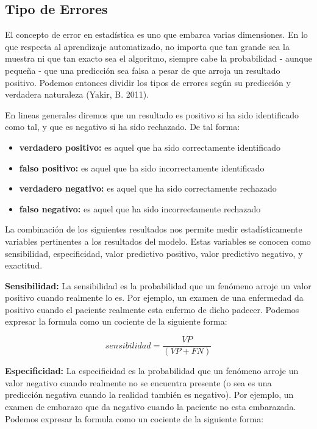 \begin{spacing}{1.5}
\subsection{Tipo de Errores}
El concepto de error en estadística es uno que embarca varias dimensiones. En lo que respecta al aprendizaje automatizado, no importa que tan grande sea la muestra ni que tan exacto sea el algoritmo, siempre cabe la probabilidad - aunque pequeña - que una predicción sea falsa a pesar de que arroja un resultado positivo. Podemos entonces dividir los tipos de errores según su predicción y verdadera naturaleza (Yakir, B. 2011). 

En lineas generales diremos que un resultado es positivo si ha sido identificado como tal, y que es negativo si ha sido rechazado. De tal forma:
\begin{itemize}
	\item \textbf{verdadero positivo:} es aquel que ha sido correctamente identificado
	\item \textbf{falso positivo:} es aquel que ha sido incorrectamente identificado
	\item \textbf{verdadero negativo:} es aquel que ha sido correctamente rechazado
	\item \textbf{falso negativo:} es aquel que ha sido incorrectamente rechazado
\end{itemize}

La combinación de los siguientes resultados nos permite medir estadísticamente variables pertinentes a los resultados del modelo. Estas variables se conocen como sensibilidad, especificidad, valor predictivo positivo, valor predictivo negativo, y exactitud.

\textbf{Sensibilidad:} La sensibilidad es la probabilidad que un fenómeno arroje un valor positivo cuando realmente lo es. Por ejemplo, un examen de una enfermedad da positivo cuando el paciente realmente esta enfermo de dicho padecer. Podemos expresar la formula como un cociente de la siguiente forma:

\begin{equation}
sensibilidad = \frac{VP}{(VP + FN)}
\end{equation}

\textbf{Especificidad:} La especificidad es la probabilidad que un fenómeno arroje un valor negativo cuando realmente no se encuentra presente (o sea es una predicción negativa cuando la realidad también es negativo). Por ejemplo, un examen de embarazo que da negativo cuando la paciente no esta embarazada. Podemos expresar la formula como un cociente de la siguiente forma:


\end{spacing}

